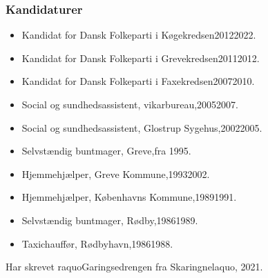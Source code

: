 \documentclass[11pt, a4paper]{awesome-cv}
\begin{document}
\begin{cvletter}
\subsubsection*{Kandidaturer}
\begin{itemize}
\item Kandidat for Dansk Folkeparti i Køgekredsen20122022.
\item Kandidat for Dansk Folkeparti i Grevekredsen20112012.
\item Kandidat for Dansk Folkeparti i Faxekredsen20072010.
\end{itemize}
\begin{itemize}
\item Social og sundhedsassistent, vikarbureau,20052007.
\item Social og sundhedsassistent, Glostrup Sygehus,20022005.
\item Selvstændig buntmager, Greve,fra 1995.
\item Hjemmehjælper, Greve Kommune,19932002.
\item Hjemmehjælper, Københavns Kommune,19891991.
\item Selvstændig buntmager, Rødby,19861989.
\item Taxichauffør, Rødbyhavn,19861988.
\end{itemize}
Har skrevet raquoGaringsedrengen fra Skaringnelaquo, 2021.

\end{cvletter}
\end{document}
